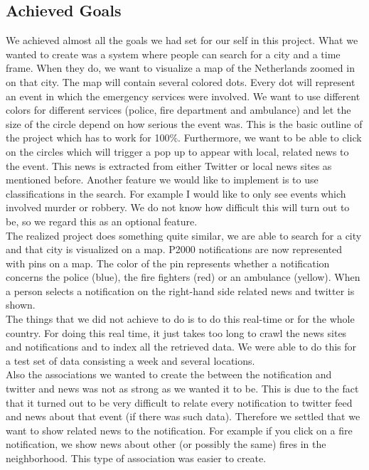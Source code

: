 \subsection{Achieved Goals}
We achieved almost all the goals we had set for our self in this project. 
What we wanted to create was a system where people can search for a city and a time frame.
When they do, we want to visualize a map of the Netherlands zoomed in on that city. 
The map will contain several colored dots. 
Every dot will represent an event in which the emergency services were involved. 
We want to use different colors for different services (police, fire department and ambulance) and let the size of the circle depend on how serious the event was. This is the basic outline of the project which has to work for 100$\%$. Furthermore, we want to be able to click on the circles which will trigger a pop up to appear with local, related news to the event. This news is extracted from either Twitter or local news sites as mentioned before. Another feature we would like to implement is to use classifications in the search. For example I would like to only see events which involved murder or robbery. We do not know how difficult this will turn out to be, so we regard this as an optional feature.\\
The realized project does something quite similar, we are able to search for a city and that city is visualized on a map.
P2000 notifications are now represented with pins on a map. 
The color of the pin represents whether a notification concerns the police (blue), the fire fighters (red) or an ambulance (yellow).
When a person selects a notification on the right-hand side related news and twitter is shown.\\
The things that we did not achieve to do is to do this real-time or for the whole country. 
For doing this real time, it just takes too long to crawl the news sites and notifications and to index all the retrieved data.
We were able to do this for a test set of data consisting a week and several locations.\\
Also the associations we wanted to create the between the notification and twitter and news was not as strong as we wanted it to be.
This is due to the fact that it turned out to be very difficult to relate every notification to twitter feed and news about that event (if there was such data).
Therefore we settled that we want to show related news to the notification.
For example if you click on a fire notification, we show news about other (or possibly the same) fires in the neighborhood.
This type of association was easier to create.\\

